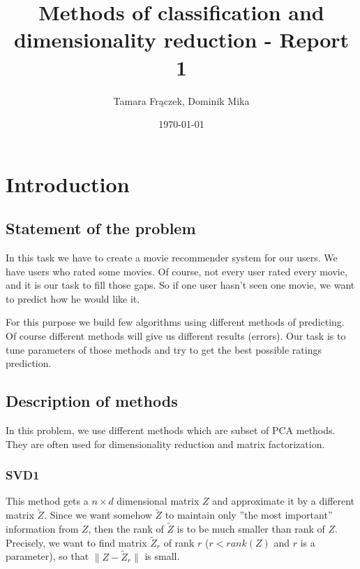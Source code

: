 \documentclass[10pt]{amsart}
\author{Tamara Frączek, Dominik Mika}
\title{Methods of classification and dimensionality reduction - Report 1}
\date{\today}
\begin{document}
\maketitle


\section{Introduction}

\subsection*{Statement of the problem}

In this task we have to create a movie recommender system for our users.
We have users who rated some movies.
Of course, not every user rated every movie, and it is our task to fill those gaps.
So if one user hasn't seen one movie, we want to predict how he would like it.





For this purpose we build few algorithms using different methods of predicting.
Of course different methods will give us different results (errors).
Our task is to tune parameters of those methods and try to get the best possible ratings prediction.



\subsection*{Description of methods}

In this problem, we use different methods which are subset of PCA methods.
They are often used for dimensionality reduction and matrix factorization.

\subsubsection*{SVD1}

This method gets a $n \times d$ dimensional matrix $Z$ and approximate it by a different matrix $\tilde{Z}$.
Since we want somehow $\tilde{Z}$ to maintain only ''the most important'' information from $Z$, then the rank of $\tilde{Z}$ is to be much smaller than rank of $Z$.
Precisely, we want to find matrix $\tilde{Z}_r$ of rank $r$ ($r < rank(Z)$ and $r$ is a parameter), so that $\|Z - \tilde{Z}_r\|$ is small.
\end{document}
